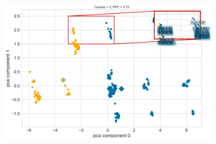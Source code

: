 \documentclass[aspectratio=169,professionalfonts, 12pt]{beamer}
\begin{document}
\begin{frame}
  \justifying
  \begin{minipage}{\textwidth}
    \begin{figure}[H]
      \centering
      \qquad
    \end{figure}
  \end{minipage}
\end{frame}

\begin{frame}
  \justifying
  \begin{minipage}{\textwidth}
    \begin{figure}[H]
      \begin{center}
        \includegraphics[scale=0.4]{images/contribution/fuzzy_partition_plot1.png}
      \end{center}
    \end{figure}
  \end{minipage}
\end{frame}
\end{document}
